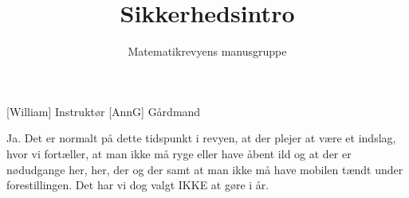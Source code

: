 \documentclass[a4paper,11pt]{article}
\title{Sikkerhedsintro}
\author{Matematikrevyens manusgruppe}
\begin{document}
\maketitle

\begin{roles}
[William] Instruktør
[AnnG] Gårdmand
\end{roles}


  
\begin{sketch}
 Ja. Det er normalt på dette tidspunkt i revyen, at der plejer at være et indslag, hvor vi fortæller, at man ikke må ryge eller have åbent ild og at der er nødudgange her, her, der og der samt at man ikke må have mobilen tændt under forestillingen.
Det har vi dog valgt IKKE at gøre i år.
\end{sketch}
\end{document}
